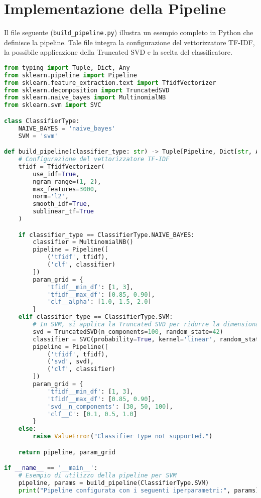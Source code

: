 \section{Implementazione della Pipeline}
Il file seguente (\texttt{build\_pipeline.py}) illustra un esempio completo in Python che definisce la pipeline. Tale file integra la configurazione del vettorizzatore TF-IDF, la possibile applicazione della Truncated SVD e la scelta del classificatore.

\begin{lstlisting}[language=Python,caption={File pipeline.py}]
from typing import Tuple, Dict, Any
from sklearn.pipeline import Pipeline
from sklearn.feature_extraction.text import TfidfVectorizer
from sklearn.decomposition import TruncatedSVD
from sklearn.naive_bayes import MultinomialNB
from sklearn.svm import SVC

class ClassifierType:
    NAIVE_BAYES = 'naive_bayes'
    SVM = 'svm'

def build_pipeline(classifier_type: str) -> Tuple[Pipeline, Dict[str, Any]]:
    # Configurazione del vettorizzatore TF-IDF
    tfidf = TfidfVectorizer(
        use_idf=True,
        ngram_range=(1, 2),
        max_features=3000,
        norm='l2',
        smooth_idf=True,
        sublinear_tf=True
    )

    if classifier_type == ClassifierType.NAIVE_BAYES:
        classifier = MultinomialNB()
        pipeline = Pipeline([
            ('tfidf', tfidf),
            ('clf', classifier)
        ])
        param_grid = {
            'tfidf__min_df': [1, 3],
            'tfidf__max_df': [0.85, 0.90],
            'clf__alpha': [1.0, 1.5, 2.0]
        }
    elif classifier_type == ClassifierType.SVM:
        # In SVM, si applica la Truncated SVD per ridurre la dimensionalita
        svd = TruncatedSVD(n_components=100, random_state=42)
        classifier = SVC(probability=True, kernel='linear', random_state=42)
        pipeline = Pipeline([
            ('tfidf', tfidf),
            ('svd', svd),
            ('clf', classifier)
        ])
        param_grid = {
            'tfidf__min_df': [1, 3],
            'tfidf__max_df': [0.85, 0.90],
            'svd__n_components': [30, 50, 100],
            'clf__C': [0.1, 0.5, 1.0]
        }
    else:
        raise ValueError("Classifier type not supported.")

    return pipeline, param_grid

if __name__ == '__main__':
    # Esempio di utilizzo della pipeline per SVM
    pipeline, params = build_pipeline(ClassifierType.SVM)
    print("Pipeline configurata con i seguenti iperparametri:", params)
\end{lstlisting}

